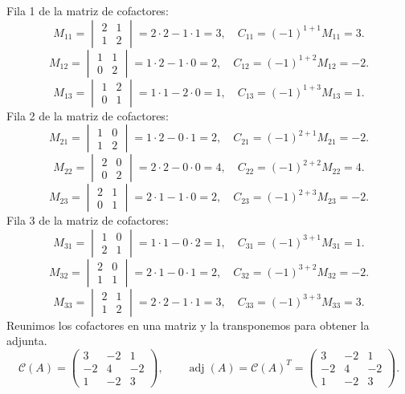 \documentclass[12pt]{article}
\newcommand{\adj}{\operatorname{adj}}
\begin{document}
Fila 1 de la matriz de cofactores:
\[
M_{11}=\begin{vmatrix}2&1\\1&2\end{vmatrix}=2\cdot 2-1\cdot 1=3,\quad C_{11}=(-1)^{1+1}M_{11}=3.
\]
\[
M_{12}=\begin{vmatrix}1&1\\0&2\end{vmatrix}=1\cdot 2-1\cdot 0=2,\quad C_{12}=(-1)^{1+2}M_{12}=-2.
\]
\[
M_{13}=\begin{vmatrix}1&2\\0&1\end{vmatrix}=1\cdot 1-2\cdot 0=1,\quad C_{13}=(-1)^{1+3}M_{13}=1.
\]
Fila 2 de la matriz de cofactores:
\[
M_{21}=\begin{vmatrix}1&0\\1&2\end{vmatrix}=1\cdot 2-0\cdot 1=2,\quad C_{21}=(-1)^{2+1}M_{21}=-2.
\]
\[
M_{22}=\begin{vmatrix}2&0\\0&2\end{vmatrix}=2\cdot 2-0\cdot 0=4,\quad C_{22}=(-1)^{2+2}M_{22}=4.
\]
\[
M_{23}=\begin{vmatrix}2&1\\0&1\end{vmatrix}=2\cdot 1-1\cdot 0=2,\quad C_{23}=(-1)^{2+3}M_{23}=-2.
\]
Fila 3 de la matriz de cofactores:
\[
M_{31}=\begin{vmatrix}1&0\\2&1\end{vmatrix}=1\cdot 1-0\cdot 2=1,\quad C_{31}=(-1)^{3+1}M_{31}=1.
\]
\[
M_{32}=\begin{vmatrix}2&0\\1&1\end{vmatrix}=2\cdot 1-0\cdot 1=2,\quad C_{32}=(-1)^{3+2}M_{32}=-2.
\]
\[
M_{33}=\begin{vmatrix}2&1\\1&2\end{vmatrix}=2\cdot 2-1\cdot 1=3,\quad C_{33}=(-1)^{3+3}M_{33}=3.
\]
Reunimos los cofactores en una matriz y la transponemos para obtener la adjunta.
\[
\mathcal{C}(A)=\begin{pmatrix}3&-2&1\\-2&4&-2\\1&-2&3\end{pmatrix},\qquad\adj(A)=\mathcal{C}(A)^T=\begin{pmatrix}3&-2&1\\-2&4&-2\\1&-2&3\end{pmatrix}.
\]
\end{document}
